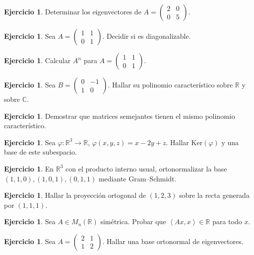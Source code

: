\documentclass[10pt,a4paper,oneside]{article}
\theoremstyle{plain}
\theoremstyle{definition}
\newtheorem{exercise}[theorem]{Ejercicio}
\theoremstyle{remark}
\newcommand{\R}{\mathbb{R}}
\newcommand{\C}{\mathbb{C}}
\newcommand{\Ker}{\mathrm{Ker}}
\newcommand{\angles}[1]{\left\langle #1 \right\rangle}
\begin{document}
\begin{exercise}
Determinar los eigenvectores de \(A=\begin{pmatrix}2&0\\0&5\end{pmatrix}\).
\end{exercise}
\begin{exercise}
Sea \(A=\begin{pmatrix}1&1\\0&1\end{pmatrix}\). Decidir si es diagonalizable.
\end{exercise}
\begin{exercise}
Calcular \(A^n\) para \(A=\begin{pmatrix}1&1\\0&1\end{pmatrix}\).
\end{exercise}
\begin{exercise}
Sea \(B=\begin{pmatrix}0&-1\\1&0\end{pmatrix}\). Hallar su polinomio característico sobre \(\R\) y sobre \(\C\).
\end{exercise}
\begin{exercise}
Demostrar que matrices semejantes tienen el mismo polinomio característico.
\end{exercise}
\begin{exercise}
Sea \(\varphi:\R^3\to\R\), \(\varphi(x,y,z)=x-2y+z\). Hallar \(\Ker(\varphi)\) y una base de este subespacio.
\end{exercise}
\begin{exercise}
En \(\R^3\) con el producto interno usual, ortonormalizar la base \((1,1,0),(1,0,1),(0,1,1)\) mediante Gram--Schmidt.
\end{exercise}
\begin{exercise}
Hallar la proyección ortogonal de \((1,2,3)\) sobre la recta generada por \((1,1,1)\).
\end{exercise}
\begin{exercise}
Sea \(A\in M_n(\R)\) simétrica. Probar que \(\angles{Ax,x}\in\R\) para todo \(x\).
\end{exercise}
\begin{exercise}
Sea \(A=\begin{pmatrix}2&1\\1&2\end{pmatrix}\). Hallar una base ortonormal de eigenvectores.
\end{exercise}
\end{document}
